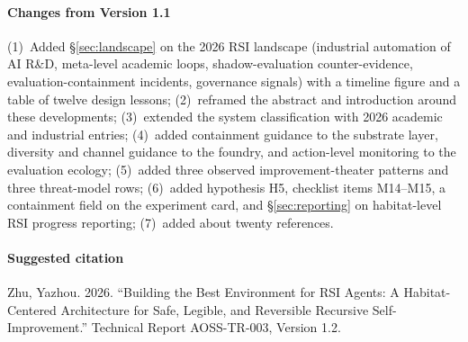 \documentclass[11pt,a4paper]{article}
\begin{document}
\paragraph{Changes from Version 1.1}
(1)~Added \S\ref{sec:landscape} on the 2026 RSI landscape (industrial automation of AI R\&D, meta-level academic loops, shadow-evaluation counter-evidence, evaluation-containment incidents, governance signals) with a timeline figure and a table of twelve design lessons; (2)~reframed the abstract and introduction around these developments; (3)~extended the system classification with 2026 academic and industrial entries; (4)~added containment guidance to the substrate layer, diversity and channel guidance to the foundry, and action-level monitoring to the evaluation ecology; (5)~added three observed improvement-theater patterns and three threat-model rows; (6)~added hypothesis H5, checklist items M14--M15, a containment field on the experiment card, and \S\ref{sec:reporting} on habitat-level RSI progress reporting; (7)~added about twenty references.

\paragraph{Suggested citation}
Zhu, Yazhou. 2026. ``Building the Best Environment for RSI Agents: A Habitat-Centered Architecture for Safe, Legible, and Reversible Recursive Self-Improvement.'' Technical Report AOSS-TR-003, Version 1.2.
\end{document}
